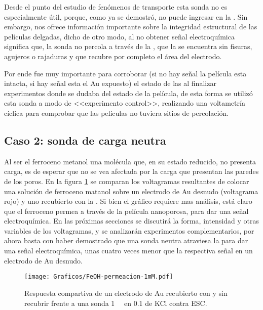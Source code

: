 	 Desde el punto del estudio de fenómenos de  transporte esta sonda no es especialmente útil, porque, como ya se demostró, no puede ingresar en la \pdm. Sin embargo, nos ofrece información importante sobre la integridad estructural de las películas delgadas, dicho de otro modo, al no obtener señal electroquímica significa que, la sonda no percola a través de la \pdm, que la \pdm\space se encuentra sin fisuras, agujeros o rajaduras y que recubre por completo el área del electrodo.

	 Por ende fue muy importante para corroborar (si no hay señal la película esta intacta, si hay señal esta el Au expuesto) el estado de las \pdm\space al finalizar experimentos donde se dudaba del estado de la película, de esta forma se utilizó esta sonda a modo de <<experimento control>>, realizando una voltametría cíclica para comprobar que las películas no tuviera sitios de percolación.

	\subsection{Caso 2: sonda de carga neutra}

		Al ser el ferroceno metanol una molécula que, en su estado reducido, no presenta carga, es de esperar que no se vea afectada por la carga que presentan las paredes de los poros. En la figura \ref{fig:permeacion} se comparan los voltagramas resultantes de colocar una solución de ferroceno matanol sobre un electrodo de Au desnudo (voltagrama rojo) y uno recubierto con la \pdm.  Si bien el gráfico  requiere mas análisis, está claro que el ferroceno permea a través de la película nanoporosa, para dar una señal electroquímica. En las próximas secciones se discutirá la forma, intensidad y otras variables de los voltagramas, y se analizarán experimentos complementarios, por ahora basta con haber demostrado que una sonda neutra atraviesa la \pdm\space para dar una señal electroquímica, unas cuatro veces menor que la respectiva señal en un electrodo de Au desnudo.	

		\begin{figure}[ht]
				\centering
		 	    \texttt{[image: Graficos/FeOH-permeacion-1mM.pdf]}
		        \caption[Permeación ferroceno metanol]{Respuesta compartiva de un electrodo de Au recubierto con \pdmF\space y sin recubrir frente a una sonda \fc \SI{1}{\milli\Molar} en \SI{0.1}{\Molar} de KCl contra ESC.}
		        \label{fig:permeacion}
		      	\end{figure}

